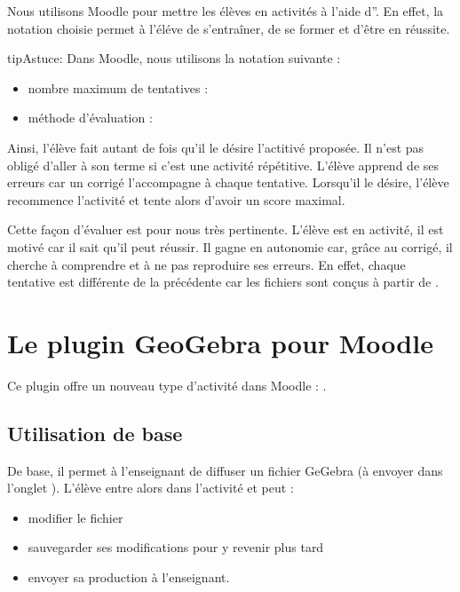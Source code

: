\documentclass[letterpaper,10pt,french]{sphinxmanual}
\begin{document}
Nous utilisons Moodle pour mettre les élèves en activités à l’aide d”. En effet, la notation choisie permet à l’éléve de s’entraîner, de se
former et d’être en réussite.

\begin{sphinxadmonition}{tip}{Astuce:}
Dans Moodle, nous utilisons la notation suivante :
\begin{itemize}
\item {} 
nombre maximum de tentatives : 

\item {} 
méthode d’évaluation : 

\end{itemize}

\noindent{}
\end{sphinxadmonition}

Ainsi, l’élève fait autant de fois qu’il le désire l’actitivé proposée. Il n’est pas
obligé d’aller à son terme si c’est une activité répétitive. L’élève apprend de ses
erreurs car un corrigé l’accompagne à chaque tentative. Lorsqu’il le désire, l’élève
recommence l’activité et tente alors d’avoir un score maximal.

Cette façon d’évaluer est pour nous très pertinente.
L’élève est en activité, il est motivé car il sait qu’il peut réussir.
Il gagne en autonomie car, grâce au corrigé, il cherche à comprendre et à ne pas
reproduire ses erreurs.
En effet, chaque tentative est différente de la précédente car les fichiers sont
conçus à partir de .


\section{Le plugin GeoGebra pour Moodle}
\label{\detokenize{projet-description:le-plugin-geogebra-pour-moodle}}
Ce plugin offre un nouveau type d’activité dans Moodle : .


\subsection{Utilisation de base}
\label{\detokenize{projet-description:utilisation-de-base}}
De base, il permet à l’enseignant de diffuser un fichier GeGebra (à envoyer dans
l’onglet ).
L’élève entre alors dans l’activité et peut :
\begin{itemize}
\item {} 
modifier le fichier

\item {} 
sauvegarder ses modifications pour y revenir plus tard

\item {} 
envoyer sa production à l’enseignant.

\end{itemize}
\end{document}
